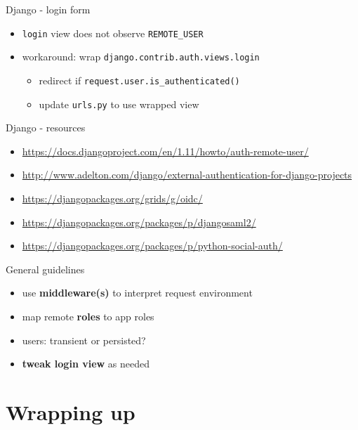 \documentclass[ignorenonframetext,aspectratio=169]{beamer}
\providecommand{\tightlist}{%
  \setlength{\itemsep}{0pt}\setlength{\parskip}{0pt}}
\begin{document}
\begin{frame}{Django - login form}
\begin{itemize}
\tightlist

\item {\tt login} view does not observe {\tt REMOTE\_USER}

\item workaround: wrap {\tt django.contrib.auth.views.login}

    \begin{itemize}
    \tightlist
    \item redirect if {\tt request.user.is\_authenticated()}
    \item update {\tt urls.py} to use wrapped view
    \end{itemize}

\end{itemize}
\end{frame}

\begin{frame}{Django - resources}
\begin{itemize}
\tightlist

\item \url{https://docs.djangoproject.com/en/1.11/howto/auth-remote-user/}
\item \url{http://www.adelton.com/django/external-authentication-for-django-projects}
\item \url{https://djangopackages.org/grids/g/oidc/}
\item \url{https://djangopackages.org/packages/p/djangosaml2/}
\item \url{https://djangopackages.org/packages/p/python-social-auth/}

\end{itemize}
\end{frame}

\begin{frame}{General guidelines}
\begin{itemize}
\tightlist
\item use {\bf middleware(s)} to interpret request environment
\item map remote {\bf roles} to app roles
\item users: transient or persisted?
\item {\bf tweak login view} as needed
\end{itemize}
\end{frame}

\section{Wrapping up}
\end{document}
